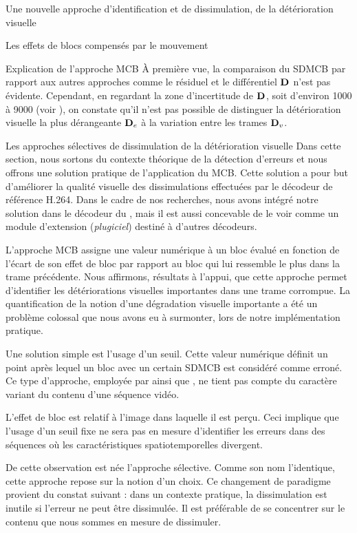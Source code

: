 \begin{chapter}{Une nouvelle approche d'identification et de dissimulation, de
la détérioration visuelle}
\begin{section}{Les effets de blocs compensés par le mouvement}
\begin{subsection}{Explication de l'approche MCB}
À première vue, la comparaison du SDMCB par rapport aux autres approches comme
le résiduel et le différentiel $\mathbf{D}_{}$ n'est pas évidente. Cependant, en
regardant la zone d'incertitude de $\mathbf{D}_{}$, soit d'environ 1000 à 9000 (voir
 ), on constate qu'il n'est pas possible
de distinguer la détérioration visuelle la plus dérangeante $\mathbf{D}_{e}$ à la
variation entre les trames $\mathbf{D}_{v}$. \FloatBarrier
\end{subsection}

\end{section}

\begin{section}{Les approches sélectives de dissimulation de la détérioration
visuelle}
\label{sect-Selectives}
Dans cette section, nous sortons du contexte théorique de la détection d'erreurs
et nous offrons une solution pratique de l'application du MCB. Cette solution a
pour but d'améliorer la qualité visuelle des dissimulations effectuées par le
décodeur de référence H.264. Dans le cadre de nos recherches, nous avons intégré
notre solution dans le décodeur du \ltCodec, mais il est aussi concevable de le
voir comme un module d'extension (\textit{plugiciel}) destiné à d'autres
décodeurs.

L'approche MCB assigne une valeur numérique à un bloc évalué en fonction de
l'écart de son effet de bloc par rapport au bloc qui lui ressemble le plus dans
la trame précédente. Nous affirmons, résultats à l'appui, que cette approche permet
d'identifier les détériorations visuelles importantes dans une trame corrompue.
La quantification de la notion d'une dégradation visuelle importante a été un
problème colossal que nous avons eu à surmonter, lors de notre implémentation
pratique.

Une solution simple est l'usage d'un seuil. Cette valeur numérique définit un
point après lequel un bloc avec un certain SDMCB est considéré comme erroné. Ce
type d'approche, employée par \citet{Superiori2007} ainsi que \citet{Ikuno2007},
ne tient pas compte du caractère variant du contenu d'une séquence vidéo.

L'effet de bloc est relatif à l'image dans laquelle il est perçu. Ceci implique
que l'usage d'un seuil fixe ne sera pas en mesure d'identifier les erreurs dans
des séquences où les caractéristiques spatiotemporelles divergent.

De cette observation est née l'approche sélective. Comme son nom l'identique,
cette approche repose sur la notion d'un choix. Ce changement de paradigme
provient du constat suivant : dans un contexte pratique, la dissimulation est
inutile si l'erreur ne peut être dissimulée. Il est préférable de se concentrer
sur le contenu que nous sommes en mesure de dissimuler.


\end{section}
\end{chapter}
